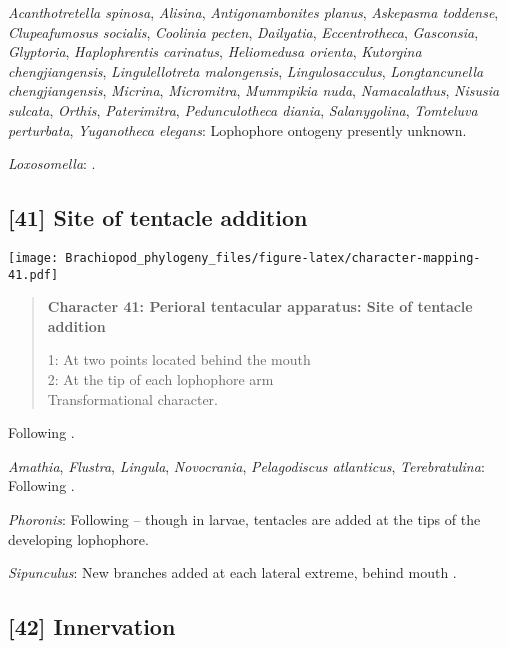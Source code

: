 \documentclass[openany]{book}
\theoremstyle{definition}
\theoremstyle{definition}
\theoremstyle{definition}
\theoremstyle{remark}
\begin{document}
\hypertarget{Acanthotretella_spinosa-coding-40}{}
\emph{Acanthotretella spinosa}, \emph{Alisina}, \emph{Antigonambonites
planus}, \emph{Askepasma toddense}, \emph{Clupeafumosus socialis},
\emph{Coolinia pecten}, \emph{Dailyatia}, \emph{Eccentrotheca},
\emph{Gasconsia}, \emph{Glyptoria}, \emph{Haplophrentis carinatus},
\emph{Heliomedusa orienta}, \emph{Kutorgina chengjiangensis},
\emph{Lingulellotreta malongensis}, \emph{Lingulosacculus},
\emph{Longtancunella chengjiangensis}, \emph{Micrina},
\emph{Micromitra}, \emph{Mummpikia nuda}, \emph{Namacalathus},
\emph{Nisusia sulcata}, \emph{Orthis}, \emph{Paterimitra},
\emph{Pedunculotheca diania}, \emph{Salanygolina}, \emph{Tomteluva
perturbata}, \emph{Yuganotheca elegans}: Lophophore ontogeny presently
unknown.

\hypertarget{Loxosomella-coding-40}{}
\emph{Loxosomella}: \citet{Nielsen1966}.

\subsection*{{[}41{]} Site of tentacle
addition}\label{site-of-tentacle-addition}

\texttt{[image: Brachiopod\_phylogeny\_files/figure-latex/character-mapping-41.pdf]}

\begin{quote}
\textbf{Character 41: Perioral tentacular apparatus: Site of tentacle
addition}

1: At two points located behind the mouth\\
2: At the tip of each lophophore arm\\
Transformational character.
\end{quote}

Following \citet{Temereva2017Innervationof}.

\hypertarget{Amathia-coding-41}{}
\emph{Amathia}, \emph{Flustra}, \emph{Lingula}, \emph{Novocrania},
\emph{Pelagodiscus atlanticus}, \emph{Terebratulina}: Following
\citet{Temereva2017Innervationof}.

\hypertarget{Phoronis-coding-41}{}
\emph{Phoronis}: Following \citet{Temereva2017Innervationof} -- though
in larvae, tentacles are added at the tips of the developing lophophore.

\hypertarget{Sipunculus-coding-41}{}
\emph{Sipunculus}: New branches added at each lateral extreme, behind
mouth \citep{Adrianov2006}.

\subsection*{{[}42{]} Innervation}\label{innervation}
\end{document}
